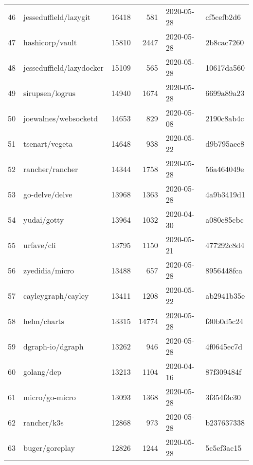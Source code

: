 \begin{longtable}{llrrll}
    46  &                              jesseduffield/lazygit &  16418 &    581 & 2020-05-28 &  cf5cefb2d6 \\
    47  &                                    hashicorp/vault &  15810 &   2447 & 2020-05-28 &  2b8cac7260 \\
    48  &                           jesseduffield/lazydocker &  15109 &    565 & 2020-05-28 &  10617da560 \\
    49  &                                    sirupsen/logrus &  14940 &   1674 & 2020-05-28 &  6699a89a23 \\
    50  &                               joewalnes/websocketd &  14653 &    829 & 2020-05-08 &  2190c8ab4c \\
    51  &                                     tsenart/vegeta &  14648 &    938 & 2020-05-22 &  d9b795aec8 \\
    52  &                                    rancher/rancher &  14344 &   1758 & 2020-05-28 &  56a464049e \\
    53  &                                     go-delve/delve &  13968 &   1363 & 2020-05-28 &  4a9b3419d1 \\
    54  &                                        yudai/gotty &  13964 &   1032 & 2020-04-30 &  a080c85cbc \\
    55  &                                         urfave/cli &  13795 &   1150 & 2020-05-21 &  477292c8d4 \\
    56  &                                     zyedidia/micro &  13488 &    657 & 2020-05-28 &  8956448fca \\
    57  &                                 cayleygraph/cayley &  13411 &   1208 & 2020-05-22 &  ab2941b35e \\
    58  &                                        helm/charts &  13315 &  14774 & 2020-05-28 &  f30b0d5c24 \\
    59  &                                   dgraph-io/dgraph &  13262 &    946 & 2020-05-28 &  4f0645ec7d \\
    60  &                                         golang/dep &  13213 &   1104 & 2020-04-16 &  87f309484f \\
    61  &                                     micro/go-micro &  13093 &   1368 & 2020-05-28 &  3f354f3c30 \\
    62  &                                        rancher/k3s &  12868 &    973 & 2020-05-28 &  b237637338 \\
    63  &                                     buger/goreplay &  12826 &   1244 & 2020-05-28 &  5c5ef3ac15 \\

\end{longtable}
